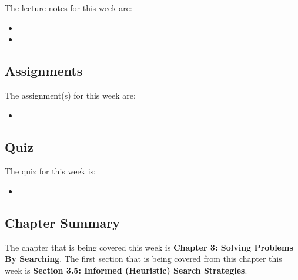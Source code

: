 \noindent The lecture notes for this week are:

\begin{itemize}
    \item {}
    \item {}
\end{itemize}

\subsection{Assignments}

The assignment(s) for this week are:

\begin{itemize}
    \item {}
\end{itemize}

\subsection{Quiz}

The quiz for this week is:

\begin{itemize}
    \item {}
\end{itemize}

\subsection{Chapter Summary}

The chapter that is being covered this week is \textbf{Chapter 3: Solving Problems By Searching}. The first section that is being covered from this chapter this week is \textbf{Section 3.5: Informed (Heuristic) Search Strategies}.

